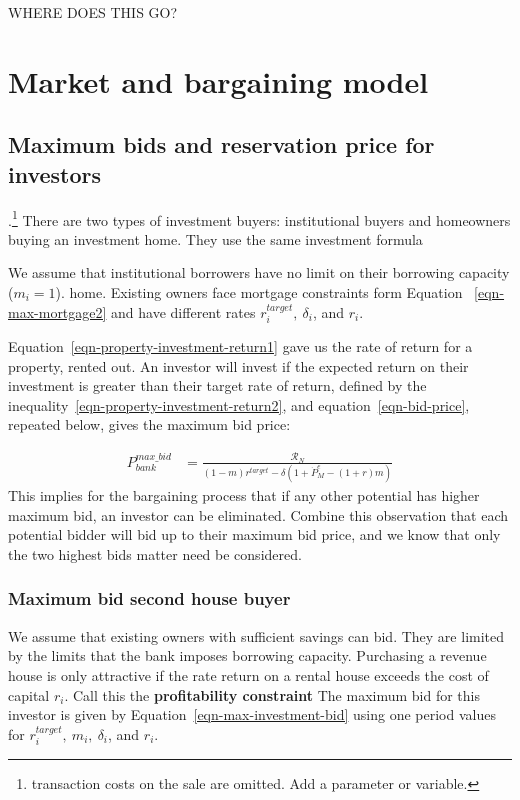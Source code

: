 {\color{red}
WHERE DOES THIS GO?

\section{Market and bargaining model}
\subsection{Maximum bids and reservation price for investors }.\footnote{transaction costs on the sale are omitted. Add a parameter or variable.}
There are two types of investment buyers: institutional buyers and homeowners buying an investment home. They use the same investment formula

We assume that institutional borrowers have no limit on their borrowing capacity ($m_i=1$). home. Existing owners face mortgage constraints form Equation ~\ref{eqn-max-mortgage2} and have different rates $r_i^{target},\ \delta_i$, and $r_i$.

Equation~\ref{eqn-property-investment-return1} gave us the rate of return for a property, rented out. An investor will invest if the expected return on their investment is greater than their target rate of return, %
defined by the inequality~\ref{eqn-property-investment-return2}, and equation~\ref{eqn-bid-price}, repeated below, gives the maximum bid price:

\begin{eqnarray}\label{eqn-max-investment-bid}
P_{bank}^{max\_bid} & = \frac{\mathcal{R}_N}{(1-m)r^{target}-\delta \left(1 + \dot P_M^e - (1+r)m\right)} 
\end{eqnarray}
This implies for the bargaining process that if any other potential  has  higher maximum bid, an investor can be eliminated. Combine this observation that each potential bidder will bid up to their maximum bid price, and we know that only the two highest bids matter need be considered.  



\subsubsection{Maximum bid second house buyer}

We assume that existing owners with sufficient savings can bid. They are limited by the limits  that the bank imposes  borrowing capacity.   Purchasing a revenue house is only attractive if the rate return on a rental house exceeds the cost of capital $r_i$. Call this the \textbf{profitability constraint} The maximum bid for this investor is given by Equation~\ref{eqn-max-investment-bid} using one period values for $r_i^{target},\ m_i,\ \delta_i$, and $r_i$.

}
